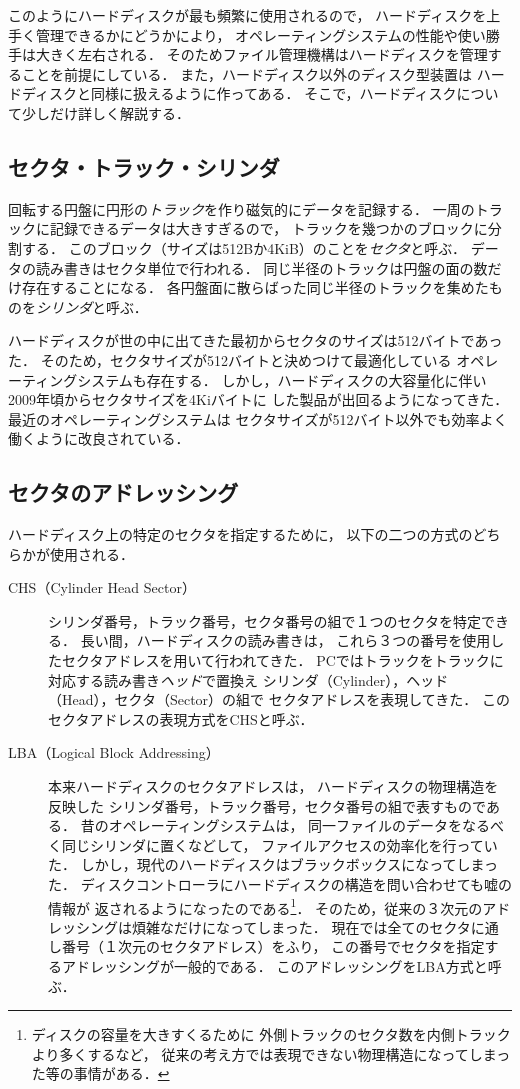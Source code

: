 このようにハードディスクが最も頻繁に使用されるので，
ハードディスクを上手く管理できるかにどうかにより，
オペレーティングシステムの性能や使い勝手は大きく左右される．
そのためファイル管理機構はハードディスクを管理することを前提にしている．
また，ハードディスク以外のディスク型装置は
ハードディスクと同様に扱えるように作ってある．
そこで，ハードディスクについて少しだけ詳しく解説する．

\subsection{セクタ・トラック・シリンダ}
回転する円盤に円形の\emph{トラック}を作り磁気的にデータを記録する．
一周のトラックに記録できるデータは大きすぎるので，
トラックを幾つかのブロックに分割する．
このブロック（サイズは512Bか4KiB）のことを\emph{セクタ}と呼ぶ．
データの読み書きはセクタ単位で行われる．
同じ半径のトラックは円盤の面の数だけ存在することになる．
各円盤面に散らばった同じ半径のトラックを集めたものを\emph{シリンダ}と呼ぶ．

ハードディスクが世の中に出てきた最初からセクタのサイズは512バイトであった．
そのため，セクタサイズが512バイトと決めつけて最適化している
オペレーティングシステムも存在する．
しかし，ハードディスクの大容量化に伴い2009年頃からセクタサイズを4Kiバイトに
した製品が出回るようになってきた．
最近のオペレーティングシステムは
セクタサイズが512バイト以外でも効率よく働くように改良されている．

\subsection{セクタのアドレッシング}
ハードディスク上の特定のセクタを指定するために，
以下の二つの方式のどちらかが使用される．

\begin{description}
\item[CHS（Cylinder Head Sector）]
  シリンダ番号，トラック番号，セクタ番号の組で１つのセクタを特定できる．
  長い間，ハードディスクの読み書きは，
  これら３つの番号を使用したセクタアドレスを用いて行われてきた．
  PCではトラックをトラックに対応する読み書き\emph{ヘッド}で置換え
  シリンダ（Cylinder），ヘッド（Head），セクタ（Sector）の組で
  セクタアドレスを表現してきた．
  このセクタアドレスの表現方式をCHSと呼ぶ．
\item[LBA（Logical Block Addressing）]
  本来ハードディスクのセクタアドレスは，
  ハードディスクの物理構造を反映した
  シリンダ番号，トラック番号，セクタ番号の組で表すものである．
  昔のオペレーティングシステムは，
  同一ファイルのデータをなるべく同じシリンダに置くなどして，
  ファイルアクセスの効率化を行っていた．
  しかし，現代のハードディスクはブラックボックスになってしまった．
  ディスクコントローラにハードディスクの構造を問い合わせても嘘の情報が
  返されるようになったのである\footnote{
    ディスクの容量を大きすくるために
    外側トラックのセクタ数を内側トラックより多くするなど，
    従来の考え方では表現できない物理構造になってしまった等の事情がある．}．
  そのため，従来の３次元のアドレッシングは煩雑なだけになってしまった．
  現在では全てのセクタに通し番号（１次元のセクタアドレス）をふり，
  この番号でセクタを指定するアドレッシングが一般的である．
  このアドレッシングをLBA方式と呼ぶ．
\end{description}

